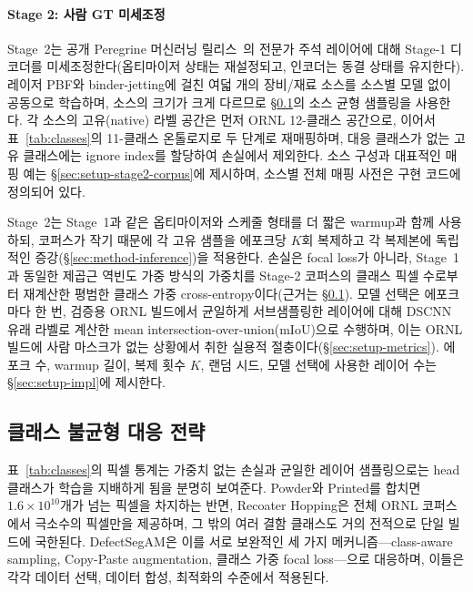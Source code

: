 \paragraph{Stage 2: 사람 GT 미세조정}
Stage~2는 공개 Peregrine 머신러닝
릴리스~\cite{Peregrine_v2021_03,Peregrine_v2022_10}의 전문가 주석
레이어에 대해 Stage-1 디코더를 미세조정한다(옵티마이저 상태는
재설정되고, 인코더는 동결 상태를 유지한다). 레이저 PBF와
binder-jetting에 걸친 여덟 개의 장비/재료 소스를 소스별 모델 없이
공동으로 학습하며, 소스의 크기가 크게 다르므로
\S\ref{sec:method-imbalance}의 소스 균형 샘플링을 사용한다. 각 소스의
고유(native) 라벨 공간은 먼저 ORNL 12-클래스 공간으로, 이어서
표~\ref{tab:classes}의 11-클래스 온톨로지로 두 단계로 재매핑하며,
대응 클래스가 없는 고유 클래스에는 ignore index를 할당하여 손실에서
제외한다. 소스 구성과 대표적인 매핑 예는
\S\ref{sec:setup-stage2-corpus}에 제시하며, 소스별 전체 매핑 사전은
구현 코드에 정의되어 있다.

Stage~2는 Stage~1과 같은 옵티마이저와 스케줄 형태를 더 짧은 warmup과
함께 사용하되, 코퍼스가 작기 때문에 각 고유 샘플을 에포크당 $K$회
복제하고 각 복제본에 독립적인 증강(\S\ref{sec:method-inference})을
적용한다. 손실은 focal loss가 아니라, Stage~1과 동일한 제곱근 역빈도
가중 방식의 가중치를 Stage-2 코퍼스의 클래스 픽셀 수로부터 재계산한
평범한 클래스 가중 cross-entropy이다(근거는
\S\ref{sec:method-imbalance}). 모델 선택은 에포크마다 한 번,
검증용 ORNL 빌드에서 균일하게 서브샘플링한 레이어에 대해 DSCNN 유래
라벨로 계산한 mean intersection-over-union(mIoU)으로 수행하며, 이는
ORNL 빌드에 사람 마스크가 없는 상황에서 취한 실용적
절충이다(\S\ref{sec:setup-metrics}). 에포크 수, warmup 길이, 복제 횟수
$K$, 랜덤 시드, 모델 선택에 사용한 레이어 수는 \S\ref{sec:setup-impl}에
제시한다.

\subsection{클래스 불균형 대응 전략}
\label{sec:method-imbalance}

표~\ref{tab:classes}의 픽셀 통계는 가중치 없는 손실과 균일한 레이어
샘플링으로는 head 클래스가 학습을 지배하게 됨을 분명히 보여준다.
Powder와 Printed를 합치면 $1.6 \times 10^{10}$개가 넘는 픽셀을
차지하는 반면, Recoater Hopping은 전체 ORNL 코퍼스에서 극소수의
픽셀만을 제공하며, 그 밖의 여러 결함 클래스도 거의 전적으로 단일
빌드에 국한된다. DefectSegAM은 이를 서로 보완적인 세 가지
메커니즘---class-aware sampling, Copy-Paste augmentation, 클래스 가중
focal loss---으로 대응하며, 이들은 각각 데이터 선택, 데이터 합성,
최적화의 수준에서 적용된다.

